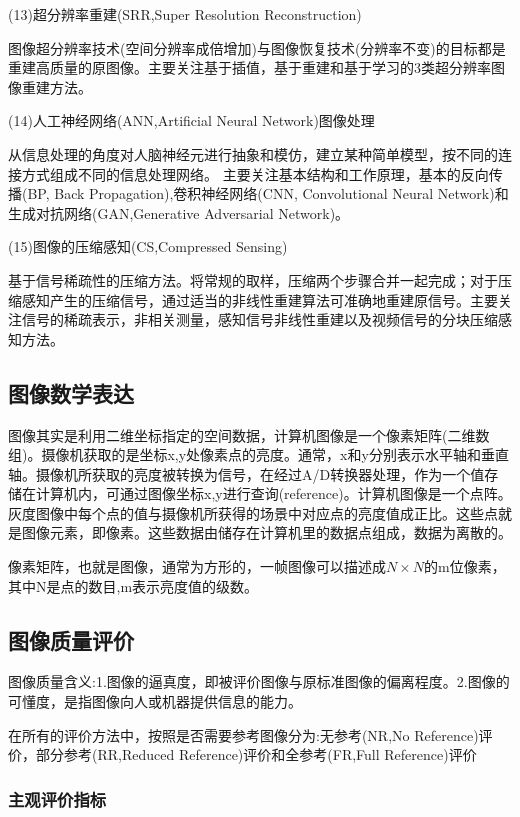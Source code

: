 \documentclass[11pt]{article}
\begin{document}
(13)超分辨率重建(SRR,Super Resolution Reconstruction)

图像超分辨率技术(空间分辨率成倍增加)与图像恢复技术(分辨率不变)的目标都是重建高质量的原图像。主要关注基于插值，基于重建和基于学习的3类超分辨率图像重建方法。

(14)人工神经网络(ANN,Artificial Neural Network)图像处理

从信息处理的角度对人脑神经元进行抽象和模仿，建立某种简单模型，按不同的连接方式组成不同的信息处理网络。
主要关注基本结构和工作原理，基本的反向传播(BP, Back Propagation),卷积神经网络(CNN, Convolutional Neural Network)和生成对抗网络(GAN,Generative Adversarial Network)。

(15)图像的压缩感知(CS,Compressed Sensing)

基于信号稀疏性的压缩方法。将常规的取样，压缩两个步骤合并一起完成；对于压缩感知产生的压缩信号，通过适当的非线性重建算法可准确地重建原信号。主要关注信号的稀疏表示，非相关测量，感知信号非线性重建以及视频信号的分块压缩感知方法。
\subsection{图像数学表达}

图像其实是利用二维坐标指定的空间数据，计算机图像是一个像素矩阵(二维数组)。摄像机获取的是坐标x,y处像素点的亮度。通常，x和y分别表示水平轴和垂直轴。摄像机所获取的亮度被转换为信号，在经过A/D转换器处理，作为一个值存储在计算机内，可通过图像坐标x,y进行查询(reference)。计算机图像是一个点阵。灰度图像中每个点的值与摄像机所获得的场景中对应点的亮度值成正比。这些点就是图像元素，即像素。这些数据由储存在计算机里的数据点组成，数据为离散的。

像素矩阵，也就是图像，通常为方形的，一帧图像可以描述成$N\times N$的m位像素，其中N是点的数目,m表示亮度值的级数。
\subsection{图像质量评价}

图像质量含义:1.图像的逼真度，即被评价图像与原标准图像的偏离程度。2.图像的可懂度，是指图像向人或机器提供信息的能力。

在所有的评价方法中，按照是否需要参考图像分为:无参考(NR,No Reference)评价，部分参考(RR,Reduced Reference)评价和全参考(FR,Full Reference)评价

\subsubsection{主观评价指标}
\end{document}
